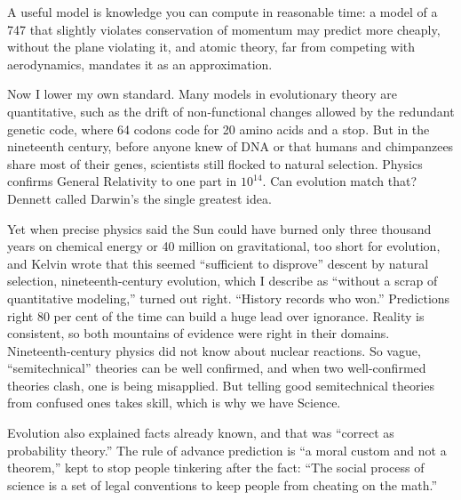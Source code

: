 A useful model is knowledge you can compute in reasonable time: a model of a 747 that slightly violates conservation of momentum may predict more cheaply, without the plane violating it, and atomic theory, far from competing with aerodynamics, mandates it as an approximation.

Now I lower my own standard. Many models in evolutionary theory are quantitative, such as the drift of non-functional changes allowed by the redundant genetic code, where 64 codons code for 20 amino acids and a stop. But in the nineteenth century, before anyone knew of DNA or that humans and chimpanzees share most of their genes, scientists still flocked to natural selection. Physics confirms General Relativity to one part in $10^{14}$. Can evolution match that? Dennett called Darwin's the single greatest idea.

Yet when precise physics said the Sun could have burned only three thousand years on chemical energy or 40 million on gravitational, too short for evolution, and Kelvin wrote that this seemed ``sufficient to disprove'' descent by natural selection, nineteenth-century evolution, which I describe as ``without a scrap of quantitative modeling,'' turned out right.  ``History records who won.'' Predictions right 80 per cent of the time can build a huge lead over ignorance. Reality is consistent, so both mountains of evidence were right in their domains. Nineteenth-century physics did not know about nuclear reactions. So vague, ``semitechnical'' theories can be well confirmed, and when two well-confirmed theories clash, one is being misapplied. But telling good semitechnical theories from confused ones takes skill, which is why we have Science. 

Evolution also explained facts already known, and that was ``correct as probability theory.'' The rule of advance prediction is ``a moral custom and not a theorem,'' kept to stop people tinkering after the fact: ``The social process of science is a set of legal conventions to keep people from cheating on the math.''

